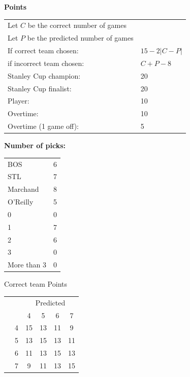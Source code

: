 \documentclass[10pt]{article}
\newcommand{\mccn}[2]{\multicolumn{#1}{c}{#2}}
\begin{document}
{\bf Points}\\
\begin{minipage}[t]{10cm}
    \vspace{0pt}
    \begin{tabular}{l l}
        Let $C$ be the correct number of games\\
        Let $P$ be the predicted number of games\\
        If correct team chosen:	   & $15 - 2 \left|{C - P}\right|$\\
        if incorrect team chosen:  & $C + P - 8$\\
        Stanley Cup champion:	& 20\\
        Stanley Cup finalist:	& 20\\
        Player:                 & 10\\
        Overtime:               & 10\\
        Overtime (1 game off):  & 5\\
    \end{tabular}

    \vspace{0.5cm}
    {\bf Number of picks:}\\
    \begin{tabular}{lc }
        BOS & 6 \\
        STL & 7 \\
        Marchand & 8 \\
        O'Reilly & 5 \\
        \rule{0pt}{3.5ex}0 & 0\\
        1 & 7\\
        2 & 6\\
        3 & 0\\
        More than 3 & 0
    \end{tabular}
\end{minipage}
%
\begin{minipage}[t]{4cm}
    \vspace{0pt}
    \qquad Correct team Points\\
    \begin{tabular}{c l | c c c c }
        \mccn{2}{} & \mccn{4}{Predicted}\\
        & & 4 & 5 & 6 & 7\\\cline{2-6}
        \parbox[t]{2mm}{} & 4 & 15 & 13 & 11 & 9\\
        & 5 & 13 & 15 & 13 & 11\\
        & 6 & 11 & 13 & 15 & 13\\
        & 7 & 9 & 11 & 13 & 15
    \end{tabular}
\end{minipage}
\end{document}
